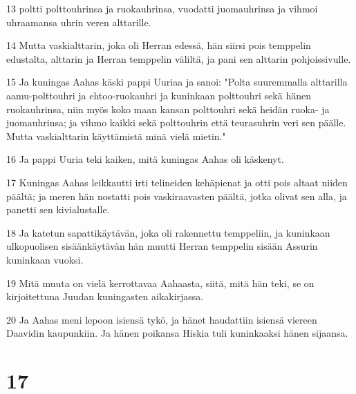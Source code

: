 \par 13 poltti polttouhrinsa ja ruokauhrinsa, vuodatti juomauhrinsa ja vihmoi uhraamansa uhrin veren alttarille.
\par 14 Mutta vaskialttarin, joka oli Herran edessä, hän siirsi pois temppelin edustalta, alttarin ja Herran temppelin väliltä, ja pani sen alttarin pohjoissivulle.
\par 15 Ja kuningas Aahas käski pappi Uuriaa ja sanoi: "Polta suuremmalla alttarilla aamu-polttouhri ja ehtoo-ruokauhri ja kuninkaan polttouhri sekä hänen ruokauhrinsa, niin myös koko maan kansan polttouhri sekä heidän ruoka- ja juomauhrinsa; ja vihmo kaikki sekä polttouhrin että teurasuhrin veri sen päälle. Mutta vaskialttarin käyttämistä minä vielä mietin."
\par 16 Ja pappi Uuria teki kaiken, mitä kuningas Aahas oli käskenyt.
\par 17 Kuningas Aahas leikkautti irti telineiden kehäpienat ja otti pois altaat niiden päältä; ja meren hän nostatti pois vaskiraavasten päältä, jotka olivat sen alla, ja panetti sen kivialustalle.
\par 18 Ja katetun sapattikäytävän, joka oli rakennettu temppeliin, ja kuninkaan ulkopuolisen sisäänkäytävän hän muutti Herran temppelin sisään Assurin kuninkaan vuoksi.
\par 19 Mitä muuta on vielä kerrottavaa Aahaasta, siitä, mitä hän teki, se on kirjoitettuna Juudan kuningasten aikakirjassa.
\par 20 Ja Aahas meni lepoon isiensä tykö, ja hänet haudattiin isiensä viereen Daavidin kaupunkiin. Ja hänen poikansa Hiskia tuli kuninkaaksi hänen sijaansa.

\chapter{17}

